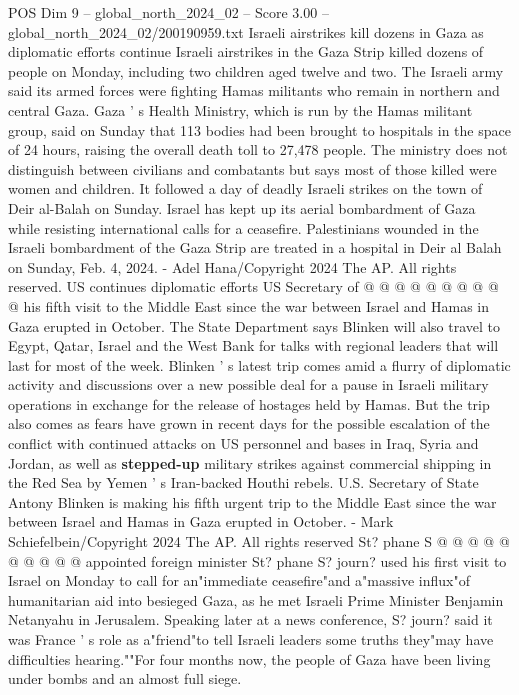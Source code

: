 \begin{textsample}{POS Dim 9 – global\_north\_2024\_02 – Score 3.00 – global\_north\_2024\_02/200190959.txt}  \label{ex:f9_pos_155}
Israeli airstrikes kill dozens in Gaza as diplomatic efforts continue Israeli airstrikes in the Gaza Strip killed dozens of people on Monday, including two children aged twelve and two.
The Israeli army said its armed forces were fighting Hamas militants who remain in northern and central Gaza.
Gaza ' s Health Ministry, which is run by the Hamas militant group, said on Sunday that 113 bodies had been brought to hospitals in the space of 24 hours, raising the overall death toll to 27,478 people.
The ministry does not distinguish between civilians and combatants but says most of those killed were women and children.
It followed a day of deadly Israeli strikes on the town of Deir al-Balah on Sunday.
Israel has kept up its aerial bombardment of Gaza while resisting international calls for a ceasefire.
Palestinians wounded in the Israeli bombardment of the Gaza Strip are treated in a hospital in Deir al Balah on Sunday, Feb. 4, 2024. - Adel Hana/Copyright 2024 The AP.
All rights reserved.
US continues diplomatic efforts US Secretary of @ @ @ @ @ @ @ @ @ @ his fifth visit to the Middle East since the war between Israel and Hamas in Gaza erupted in October.
The State Department says Blinken will also travel to Egypt, Qatar, Israel and the West Bank for talks with regional leaders that will last for most of the week.
Blinken ' s latest trip comes amid a flurry of diplomatic activity and discussions over a new possible deal for a pause in Israeli military operations in exchange for the release of hostages held by Hamas.
But the trip also comes as fears have grown in recent days for the possible escalation of the conflict with continued attacks on US personnel and bases in Iraq, Syria and Jordan, as well as \textbf{stepped-up} military strikes against commercial shipping in the Red Sea by Yemen ' s Iran-backed Houthi rebels.
U.S.
Secretary of State Antony Blinken is making his fifth urgent trip to the Middle East since the war between Israel and Hamas in Gaza erupted in October. - Mark Schiefelbein/Copyright 2024 The AP.
All rights reserved St? phane S @ @ @ @ @ @ @ @ @ @ appointed foreign minister St? phane S? journ? used his first visit to Israel on Monday to call for an"immediate ceasefire"and a"massive influx"of humanitarian aid into besieged Gaza, as he met Israeli Prime Minister Benjamin Netanyahu in Jerusalem.
Speaking later at a news conference, S? journ? said it was France ' s role as a"friend"to tell Israeli leaders some truths they"may have difficulties hearing.""For four months now, the people of Gaza have been living under bombs and an almost full siege.

\end{textsample}
